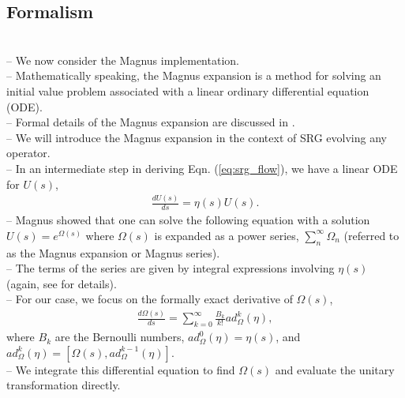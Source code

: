\documentclass[preprintnumbers,floatfix,aps,prc,preprint,nofootinbib]{revtex4-1}
\begin{document}


\subsection{Formalism}
\label{sec:magnus_expansion_formalism}


\\
-- We now consider the Magnus implementation.
\\
-- Mathematically speaking, the Magnus expansion is a method for solving an initial value problem associated with a linear ordinary differential equation (ODE).
\\
-- Formal details of the Magnus expansion are discussed in \cite{Blanes:2009ab}.
\\
-- We will introduce the Magnus expansion in the context of SRG evolving any operator.
\\
-- In an intermediate step in deriving Eqn. (\ref{eq:srg_flow}), we have a linear ODE for $U(s)$,
%
\begin{eqnarray}
	\label{eq:unitary_trans}
	\frac{dU(s)}{ds} = \eta(s) U(s).
\end{eqnarray}
%
-- Magnus showed that one can solve the following equation with a solution $U(s)=e^{\Omega(s)}$ where $\Omega(s)$ is expanded as a power series, $\sum_{n}^{\infty} \Omega_n$ (referred to as the Magnus expansion or Magnus series).
\\
-- The terms of the series are given by integral expressions involving $\eta(s)$ (again, see \cite{Blanes:2009ab, Magnus:1954zz} for details).
\\
-- For our case, we focus on the formally exact derivative of $\Omega(s)$,
%
\begin{eqnarray}
	\label{eq:magnus_omega}
	\frac{d\Omega(s)}{ds} = \sum_{k=0}^{\infty} \frac{B_k}{k!} ad_{\Omega}^{k}(\eta),
\end{eqnarray}
%
where $B_k$ are the Bernoulli numbers, $ad_{\Omega}^{0}(\eta)=\eta(s)$, and $ad_{\Omega}^{k}(\eta)=[\Omega(s),ad_{\Omega}^{k-1}(\eta)]$.
\\
-- We integrate this differential equation to find $\Omega(s)$ and evaluate the unitary transformation directly.
\end{document}
